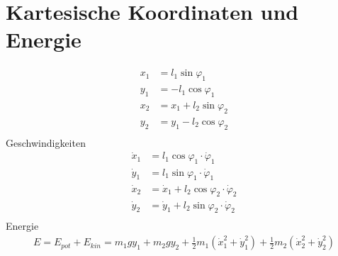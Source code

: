 \documentclass[12pt,a4paper,titlepage,headinclude,bibtotoc]{scrartcl}
\begin{document}
\section{Kartesische Koordinaten und Energie}
\begin{align*}
	x_1 &= l_1\sin\varphi_1\\
	y_1 &= -l_1\cos\varphi_1\\	
	x_2 &= x_1+l_2\sin\varphi_2\\
	y_2 &= y_1-l_2\cos\varphi_2\\
\end{align*}
Geschwindigkeiten
\begin{align*}
	\dot{x}_1 &= l_1\cos\varphi_1 \cdot \dot{\varphi}_1\\
	\dot{y}_1 &= l_1\sin\varphi_1 \cdot \dot{\varphi}_1\\	
	\dot{x}_2 &= \dot{x}_1 + l_2\cos\varphi_2 \cdot \dot{\varphi}_2\\
	\dot{y}_2 &= \dot{y}_1 + l_2\sin\varphi_2 \cdot \dot{\varphi}_2\\
\end{align*}
Energie
\begin{align*}
	E = E_{pot}+E_{kin} = m_1gy_1+m_2gy_2 + \frac{1}{2}m_1\left(\dot{x}_1^2+\dot{y}_1^2\right) + \frac{1}{2}m_2\left(\dot{x}_2^2+\dot{y}_2^2\right)
\end{align*}
\end{document}
